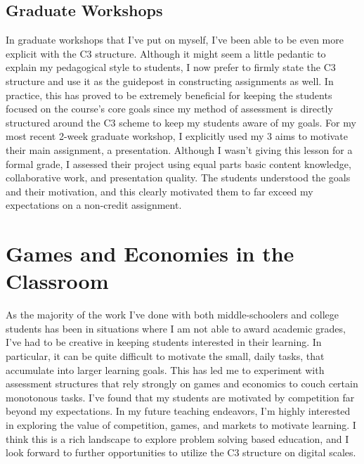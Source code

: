 \documentclass[12pt]{amsart} \usepackage{amssymb}
\begin{document}
\subsection*{Graduate Workshops}
In graduate workshops that I've put on myself, I've been able to be even more explicit with the C3 structure. Although it might seem a little pedantic to explain my pedagogical style to students, I now prefer to firmly state the C3 structure and use it as the guidepost in constructing assignments as well.  In practice, this has proved to be extremely beneficial for keeping the students focused on the course's core goals since my method of assessment is directly structured around the C3 scheme to keep my students aware of my goals.  For my most recent 2-week graduate workshop, I explicitly used my 3 aims to motivate their main assignment, a presentation. Although I wasn't giving this lesson for a formal grade, I assessed their project using equal parts basic content knowledge, collaborative work, and presentation quality. The students understood the goals and their motivation, and this clearly motivated them to far exceed my expectations on a non-credit assignment.  

\section*{Games and Economies in the Classroom}
As the majority of the work I've done with both middle-schoolers and college students has been in situations where I am not able to award academic grades, I've had to be creative in keeping students interested in their learning.  In particular, it can be quite difficult to motivate the small, daily tasks, that accumulate into larger learning goals.  This has led me to experiment with assessment structures that rely strongly on games and economics to couch certain monotonous tasks.  I've found that my students are motivated by competition far beyond my expectations.  In my future teaching endeavors, I'm highly interested in exploring the value of competition, games, and markets to motivate learning.  I think this is a rich landscape to explore problem solving based education, and I look forward to further opportunities to utilize the C3 structure on digital scales.
\end{document}
